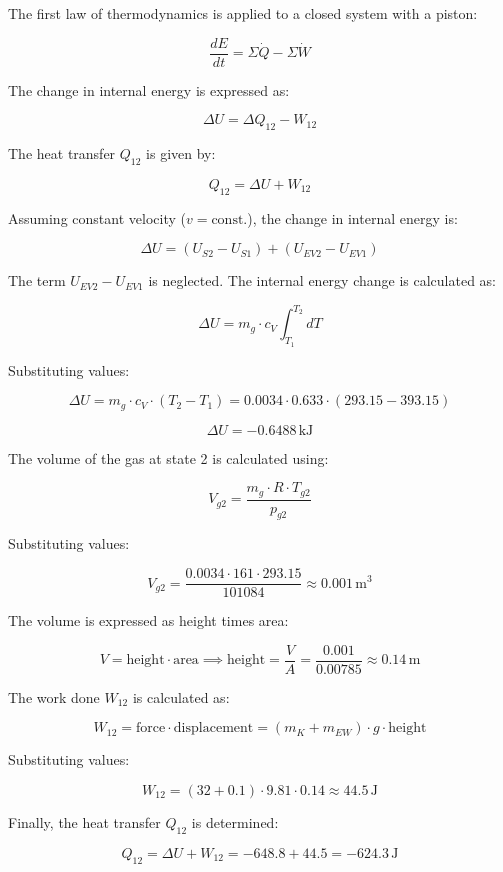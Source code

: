 The first law of thermodynamics is applied to a closed system with a piston:  

\[
\frac{dE}{dt} = \Sigma \dot{Q} - \Sigma \dot{W}
\]  

The change in internal energy is expressed as:  

\[
\Delta U = \Delta Q_{12} - W_{12}
\]  

The heat transfer \( Q_{12} \) is given by:  

\[
Q_{12} = \Delta U + W_{12}
\]  

Assuming constant velocity (\( v = \text{const.} \)), the change in internal energy is:  

\[
\Delta U = (U_{S2} - U_{S1}) + (U_{EV2} - U_{EV1})
\]  

The term \( U_{EV2} - U_{EV1} \) is neglected. The internal energy change is calculated as:  

\[
\Delta U = m_g \cdot c_V \int_{T_1}^{T_2} dT
\]  

Substituting values:  

\[
\Delta U = m_g \cdot c_V \cdot (T_2 - T_1) = 0.0034 \cdot 0.633 \cdot (293.15 - 393.15)
\]  

\[
\Delta U = -0.6488 \, \text{kJ}
\]  

The volume of the gas at state 2 is calculated using:  

\[
V_{g2} = \frac{m_g \cdot R \cdot T_{g2}}{p_{g2}}
\]  

Substituting values:  

\[
V_{g2} = \frac{0.0034 \cdot 161 \cdot 293.15}{101084} \approx 0.001 \, \text{m}^3
\]  

The volume is expressed as height times area:  

\[
V = \text{height} \cdot \text{area} \implies \text{height} = \frac{V}{A} = \frac{0.001}{0.00785} \approx 0.14 \, \text{m}
\]  

The work done \( W_{12} \) is calculated as:  

\[
W_{12} = \text{force} \cdot \text{displacement} = (m_K + m_{EW}) \cdot g \cdot \text{height}
\]  

Substituting values:  

\[
W_{12} = (32 + 0.1) \cdot 9.81 \cdot 0.14 \approx 44.5 \, \text{J}
\]  

Finally, the heat transfer \( Q_{12} \) is determined:  

\[
Q_{12} = \Delta U + W_{12} = -648.8 + 44.5 = -624.3 \, \text{J}
\]